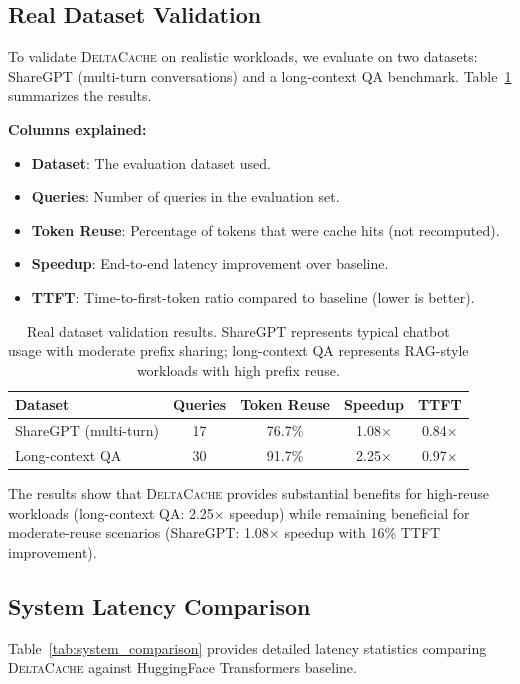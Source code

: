 \documentclass{article}
\newcommand{\deltacache}{\textsc{DeltaCache}}
\begin{document}
\subsection{Real Dataset Validation}

To validate \deltacache{} on realistic workloads, we evaluate on two datasets: ShareGPT (multi-turn conversations) and a long-context QA benchmark.
Table~\ref{tab:real_datasets} summarizes the results.

\textbf{Columns explained:}
\begin{itemize}
    \item \textbf{Dataset}: The evaluation dataset used.
    \item \textbf{Queries}: Number of queries in the evaluation set.
    \item \textbf{Token Reuse}: Percentage of tokens that were cache hits (not recomputed).
    \item \textbf{Speedup}: End-to-end latency improvement over baseline.
    \item \textbf{TTFT}: Time-to-first-token ratio compared to baseline (lower is better).
\end{itemize}

\begin{table}[h]
\centering
\caption{Real dataset validation results. ShareGPT represents typical chatbot usage with moderate prefix sharing; long-context QA represents RAG-style workloads with high prefix reuse.}
\label{tab:real_datasets}
\begin{tabular}{lcccc}
\toprule
Dataset & Queries & Token Reuse & Speedup & TTFT \\
\midrule
ShareGPT (multi-turn) & 17 & 76.7\% & 1.08$\times$ & 0.84$\times$ \\
Long-context QA & 30 & 91.7\% & 2.25$\times$ & 0.97$\times$ \\
\bottomrule
\end{tabular}
\end{table}

The results show that \deltacache{} provides substantial benefits for high-reuse workloads (long-context QA: 2.25$\times$ speedup) while remaining beneficial for moderate-reuse scenarios (ShareGPT: 1.08$\times$ speedup with 16\% TTFT improvement).

\subsection{System Latency Comparison}

Table~\ref{tab:system_comparison} provides detailed latency statistics comparing \deltacache{} against HuggingFace Transformers baseline.
\end{document}
